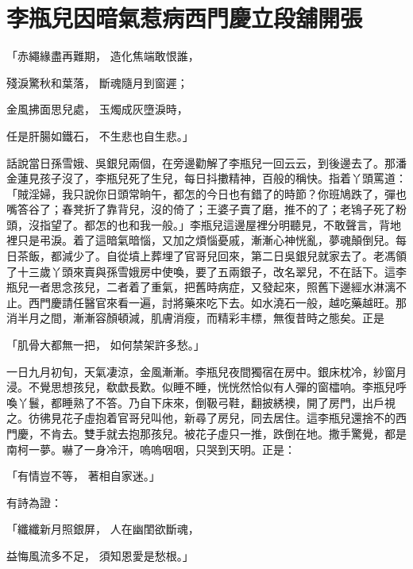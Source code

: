 %

\chapter{李瓶兒因暗氣惹病\KG 西門慶立段舖開張}


「赤繩緣盡再難期，  造化焦端敢恨誰，

殘淚驚秋和葉落，  斷魂隨月到窗遲；

金風拂面思兒處，  玉燭成灰墮淚時，

任是肝腸如鐵石，  不生悲也自生悲。」

話說當日孫雪娥、吳銀兒兩個，在旁邊勸解了李瓶兒一回云云，到後邊去了。那潘金蓮見孩子沒了，李瓶兒死了生兒，每日抖擻精神，百般的稱快。指着丫頭罵道：「賊淫婦，我只說你日頭常晌午，都怎的今日也有錯了的時節？你班鳩跌了，彈也嘴答谷了；春凳折了靠背兒，沒的倚了；王婆子賣了磨，推不的了；老鴇子死了粉頭，沒指望了。都怎的也和我一般。」李瓶兒這邊屋裡分明聽見，不敢聲言，背地裡只是弔淚。着了這暗氣暗惱，又加之煩惱憂戚，漸漸心神恍亂，夢魂顛倒兒。每日茶飯，都減少了。自從墳上葬埋了官哥兒回來，第二日吳銀兒就家去了。老馮領了十三歲丫頭來賣與孫雪娥房中使喚，要了五兩銀子，改名翠兒，不在話下。這李瓶兒一者思念孩兒，二者着了重氣，把舊時病症，又發起來，照舊下邊經水淋漓不止。西門慶請任醫官來看一遍，討將藥來吃下去。如水澆石一般，越吃藥越旺。那消半月之間，漸漸容顏頓減，肌膚消瘦，而精彩丰標，無復昔時之態矣。正是

「肌骨大都無一把，  如何禁架許多愁。」

一日九月初旬，天氣凄涼，金風漸漸。李瓶兒夜間獨宿在房中。銀床枕冷，紗窗月浸。不覺思想孩兒，欷歔長歎。似睡不睡，恍恍然恰似有人彈的窗櫺响。李瓶兒呼喚丫鬟，都睡熟了不答。乃自下床來，倒靸弓鞋，翻披綉襖，開了房門，出戶視之。彷彿見花子虛抱着官哥兒叫他，新尋了房兒，同去居住。這李瓶兒還捨不的西門慶，不肯去。雙手就去抱那孩兒。被花子虛只一推，跌倒在地。撒手驚覺，都是南柯一夢。嚇了一身冷汗，嗚嗚咽咽，只哭到天明。正是：

「有情豈不等，  著相自家迷。」

有詩為證：

「纖纖新月照銀屏，  人在幽閨欲斷魂，

益悔風流多不足，  須知恩愛是愁根。」

